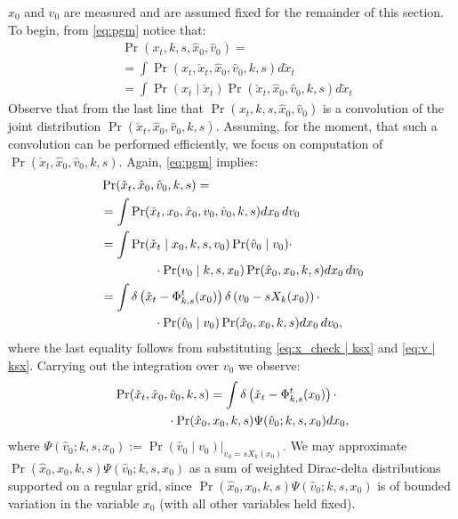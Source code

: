 \documentclass[letterpaper,10pt,conference]{ieeeconf}
\begin{document}
$\hat{x}_0$ and $\hat{v}_0$ are measured and are assumed fixed for the remainder of this section.
To begin, from \eqref{eq:pgm}  notice that:
\begin{align}
	&\Pr( x_t, k,s,\hat{x}_0, \hat{v}_0) =\\
	&= \int \Pr( x_t, \check{x}_t , \hat{x}_0, \hat{v}_0, k,s) d\check{x}_t \\
	&= \int \Pr( x_t \mid \check{x}_t ) \Pr(\check{x}_t , \hat{x}_0, \hat{v}_0, k,s) d\check{x}_t \label{eq:convolve}
\end{align}
Observe that from the last line that $\Pr( x_t, k,s, \hat{x}_0, \hat{v}_0)$ is a convolution of the joint distribution $\Pr( \check{x}_t , \hat{x}_0, \hat{v}_0, k,s)$.
Assuming, for the moment, that such a convolution can be performed efficiently, we focus on computation of $\Pr( \check{x}_t , \hat{x}_0, \hat{v}_0, k,s)$.
Again, \eqref{eq:pgm} implies:
\begin{align}
	&\Pr( \check{x}_t , \hat{x}_0, \hat{v}_0, k,s) = \\
	&= \int \Pr( \check{x}_t , x_0, \hat{x}_0, v_0, \hat{v}_0, k,s) dx_0 \, dv_0 \\
	&= \int \Pr( \check{x}_t \mid  x_0, k,s, v_0) \Pr( \hat{v}_0 \mid v_0) \cdot \\
	& \hspace{10ex}  \cdot \Pr( v_0 \mid k,s,x_0) \Pr(\hat{x}_0, x_0, k, s) dx_0 \, dv_0 \nonumber \\
		&= \int \delta\left( \check{x}_t - \Phi_{k,s}^{t}( x_0) \right) \delta\left( v_0 - s X_k (x_0) \right) \cdot \\
		&\hspace{10ex} \cdot\Pr( \hat{v}_0 \mid v_0) \Pr(\hat{x}_0, x_0,k, s) dx_0\, dv_0, \nonumber
\end{align}
where the last equality follows from substituting \eqref{eq:x_check | ksx} and \eqref{eq:v | ksx}.
 Carrying out the integration over $v_0$ we observe:
\begin{align}
\begin{split}
	&\Pr( \check{x}_t , \hat{x}_0, \hat{v}_0, k,s) = \int \delta\left( \check{x}_t - \Phi_{k,s}^{t}( x_0) \right)  \cdot \\
	&\hspace{10ex} \cdot \Pr(\hat{x}_0, x_0, k, s) \Psi(\hat{v}_0 ;k,s,x_0) dx_0,
\end{split}
\label{eq:push forward}
\end{align}
 where $\Psi( \hat{v}_0 ;k,s,x_0) := \left. \Pr( \hat{v}_0 \mid v_0) \right|_{v_0 = s X_k(x_0)}$.
 We may approximate $\Pr(\hat{x}_0, x_0, k, s) \Psi( \hat{v}_0 ; k, s, x_0)$ as a sum of weighted Dirac-delta distributions supported on a regular grid, since $\Pr(\hat{x}_0, x_0, k, s) \Psi( \hat{v}_0 ; k, s, x_0)$  is of bounded variation in the variable $x_0$ (with all other variables held fixed).
 
\end{document}
